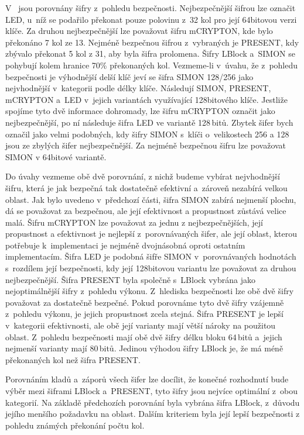 V~ jsou porovnány šifry z~pohledu bezpečnosti. Nejbezpečnější šifrou lze označit LED, u~níž se podařilo překonat pouze polovinu z~32 kol pro její 64bitovou verzi klíče. Za druhou nejbezpečnější lze považovat šifru mCRYPTON, kde bylo překonáno 7 kol ze 13. Nejméně bezpečnou šifrou z~vybraných je PRESENT, kdy zbývalo překonat 5 kol z 31, aby byla šifra prolomena. Šifry LBlock a~SIMON se pohybují kolem hranice 70\% překonaných kol. Vezmeme-li v~úvahu, že z~pohledu bezpečnosti je výhodnější delší klíč jeví se šifra SIMON 128/256 jako nejvhodnější v~kategorii podle délky klíče. Následují SIMON, PRESENT, mCRYPTON a~LED v~jejich variantách využívající 128bitového klíče. Jestliže spojíme tyto dvě informace dohromady, lze šifru mCRYPTON označit jako nejbezpečnější, po ní následuje šifra LED ve variantě 128\,bitů. Zbytek šifer bych označil jako velmi podobných, kdy šifry SIMON s~klíči o~velikostech 256 a 128 jsou ze zbylých šifer nejbezpečnější. Za nejméně bezpečnou šifru lze považovat SIMON v 64bitové variantě. 

Do úvahy vezmeme obě dvě porovnání, z nichž budeme vybírat nejvhodnější šifru, která je jak bezpečná tak dostatečně efektivní a~zároveň nezabírá velkou oblast. Jak bylo uvedeno v~předchozí části, šifra SIMON zabírá nejmenší plochu, dá se považovat za bezpečnou, ale její efektivnost a propustnost zůstává velice malá. Šifru mCRYPTON lze považovat za jednu z nejbezpečnějších, její propustnost a efektivnost je nejlepší z~porovnávaných šifer, ale její oblast, kterou potřebuje k~implementaci je nejméně dvojnásobná oproti ostatním implementacím. Šifra LED je podobná šifře SIMON v~porovnávaných hodnotách s~rozdílem její bezpečnosti, kdy její 128bitovou variantu lze považovat za druhou nejbezpečnější. Šifra PRESENT byla společně s~LBlock vybrána jako nejoptimálnější šifry z~pohledu výkonu. Z~hlediska bezpečnosti lze obě dvě šifry považovat za dostatečně bezpečné. Pokud porovnáme tyto dvě šifry vzájemně z~pohledu výkonu, je jejich propustnost zcela stejná. Šifra PRESENT je lepší v~kategorii efektivnosti, ale obě její varianty mají větší nároky na použitou oblast. Z~pohledu bezpečnosti mají obě dvě šifry délku bloku 64\,bitů a~jejich nejmenší varianty mají 80\,bitů. Jedinou výhodou šifry LBlock je, že má méně překonaných kol než šifra PRESENT.

Porovnáním kladů a~záporů všech šifer lze docílit, že konečné rozhodnutí bude výběr mezi šiframi LBlock a~PRESENT, tyto šifry jsou nejvíce optimální z~obou kategorií. Na základě předchozích porovnání byla vybrána šifra LBlock, z~důvodu jejího menšího požadavku na oblast. Dalším kriteriem byla její lepší bezpečnosti z pohledu známých překonání počtu kol. 

